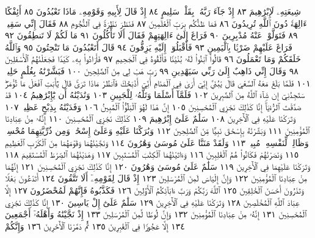 شِيعَتِهِۦ لَإِبْرَٰهِيمَ ٨٣ إِذْ جَآءَ رَبَّهُۥ بِقَلْبࣲ سَلِيمٍ ٨٤ إِذْ قَالَ لِأَبِيهِ
وَقَوْمِهِۦ مَاذَا تَعْبُدُونَ ٨٥ أَئِفْكًا ءَالِهَةࣰ دُونَ ٱللَّهِ تُرِيدُونَ ٨٦
فَمَا ظَنُّكُم بِرَبِّ ٱلْعَٰلَمِينَ ٨٧ فَنَظَرَ نَظْرَةࣰ فِي ٱلنُّجُومِ ٨٨
فَقَالَ إِنِّي سَقِيمࣱ ٨٩ فَتَوَلَّوْا۟ عَنْهُ مُدْبِرِينَ ٩٠ فَرَاغَ إِلَىٰٓ ءَالِهَتِهِمْ
فَقَالَ أَلَا تَأْكُلُونَ ٩١ مَا لَكُمْ لَا تَنطِقُونَ ٩٢ فَرَاغَ عَلَيْهِمْ ضَرْبَۢا
بِٱلْيَمِينِ ٩٣ فَأَقْبَلُوٓا۟ إِلَيْهِ يَزِفُّونَ ٩٤ قَالَ أَتَعْبُدُونَ مَا تَنْحِتُونَ ٩٥
وَٱللَّهُ خَلَقَكُمْ وَمَا تَعْمَلُونَ ٩٦ قَالُوا۟ ٱبْنُوا۟ لَهُۥ بُنْيَٰنࣰا فَأَلْقُوهُ
فِي ٱلْجَحِيمِ ٩٧ فَأَرَادُوا۟ بِهِۦ كَيْدࣰا فَجَعَلْنَٰهُمُ ٱلْأَسْفَلِينَ ٩٨
وَقَالَ إِنِّي ذَاهِبٌ إِلَىٰ رَبِّي سَيَهْدِينِ ٩٩ رَبِّ هَبْ لِي مِنَ ٱلصَّٰلِحِينَ ١٠٠
فَبَشَّرْنَٰهُ بِغُلَٰمٍ حَلِيمࣲ ١٠١ فَلَمَّا بَلَغَ مَعَهُ ٱلسَّعْيَ قَالَ يَٰبُنَيَّ
إِنِّيٓ أَرَىٰ فِي ٱلْمَنَامِ أَنِّيٓ أَذْبَحُكَ فَٱنظُرْ مَاذَا تَرَىٰۚ قَالَ يَٰٓأَبَتِ
ٱفْعَلْ مَا تُؤْمَرُۖ سَتَجِدُنِيٓ إِن شَآءَ ٱللَّهُ مِنَ ٱلصَّٰبِرِينَ ١٠٢
فَلَمَّآ أَسْلَمَا وَتَلَّهُۥ لِلْجَبِينِ ١٠٣ وَنَٰدَيْنَٰهُ أَن يَٰٓإِبْرَٰهِيمُ ١٠٤
قَدْ صَدَّقْتَ ٱلرُّءْيَآۚ إِنَّا كَذَٰلِكَ نَجْزِي ٱلْمُحْسِنِينَ ١٠٥ إِنَّ
هَٰذَا لَهُوَ ٱلْبَلَٰٓؤُا۟ ٱلْمُبِينُ ١٠٦ وَفَدَيْنَٰهُ بِذِبْحٍ عَظِيمࣲ ١٠٧ وَتَرَكْنَا
عَلَيْهِ فِي ٱلْأٓخِرِينَ ١٠٨ سَلَٰمٌ عَلَىٰٓ إِبْرَٰهِيمَ ١٠٩ كَذَٰلِكَ نَجْزِي
ٱلْمُحْسِنِينَ ١١٠ إِنَّهُۥ مِنْ عِبَادِنَا ٱلْمُؤْمِنِينَ ١١١ وَبَشَّرْنَٰهُ
بِإِسْحَٰقَ نَبِيࣰّا مِّنَ ٱلصَّٰلِحِينَ ١١٢ وَبَٰرَكْنَا عَلَيْهِ وَعَلَىٰٓ إِسْحَٰقَۚ
وَمِن ذُرِّيَّتِهِمَا مُحْسِنࣱ وَظَالِمࣱ لِّنَفْسِهِۦ مُبِينࣱ ١١٣ وَلَقَدْ مَنَنَّا
عَلَىٰ مُوسَىٰ وَهَٰرُونَ ١١٤ وَنَجَّيْنَٰهُمَا وَقَوْمَهُمَا مِنَ ٱلْكَرْبِ
ٱلْعَظِيمِ ١١٥ وَنَصَرْنَٰهُمْ فَكَانُوا۟ هُمُ ٱلْغَٰلِبِينَ ١١٦ وَءَاتَيْنَٰهُمَا
ٱلْكِتَٰبَ ٱلْمُسْتَبِينَ ١١٧ وَهَدَيْنَٰهُمَا ٱلصِّرَٰطَ ٱلْمُسْتَقِيمَ ١١٨
وَتَرَكْنَا عَلَيْهِمَا فِي ٱلْأٓخِرِينَ ١١٩ سَلَٰمٌ عَلَىٰ مُوسَىٰ
وَهَٰرُونَ ١٢٠ إِنَّا كَذَٰلِكَ نَجْزِي ٱلْمُحْسِنِينَ ١٢١ إِنَّهُمَا
مِنْ عِبَادِنَا ٱلْمُؤْمِنِينَ ١٢٢ وَإِنَّ إِلْيَاسَ لَمِنَ ٱلْمُرْسَلِينَ ١٢٣
إِذْ قَالَ لِقَوْمِهِۦٓ أَلَا تَتَّقُونَ ١٢٤ أَتَدْعُونَ بَعْلࣰا وَتَذَرُونَ أَحْسَنَ
ٱلْخَٰلِقِينَ ١٢٥ ٱللَّهَ رَبَّكُمْ وَرَبَّ ءَابَآئِكُمُ ٱلْأَوَّلِينَ ١٢٦
فَكَذَّبُوهُ فَإِنَّهُمْ لَمُحْضَرُونَ ١٢٧ إِلَّا عِبَادَ ٱللَّهِ ٱلْمُخْلَصِينَ ١٢٨
وَتَرَكْنَا عَلَيْهِ فِي ٱلْأٓخِرِينَ ١٢٩ سَلَٰمٌ عَلَىٰٓ إِلْ يَاسِينَ ١٣٠ إِنَّا
كَذَٰلِكَ نَجْزِي ٱلْمُحْسِنِينَ ١٣١ إِنَّهُۥ مِنْ عِبَادِنَا ٱلْمُؤْمِنِينَ ١٣٢
وَإِنَّ لُوطࣰا لَّمِنَ ٱلْمُرْسَلِينَ ١٣٣ إِذْ نَجَّيْنَٰهُ وَأَهْلَهُۥٓ أَجْمَعِينَ ١٣٤
إِلَّا عَجُوزࣰا فِي ٱلْغَٰبِرِينَ ١٣٥ ثُمَّ دَمَّرْنَا ٱلْأٓخَرِينَ ١٣٦ وَإِنَّكُمْ
